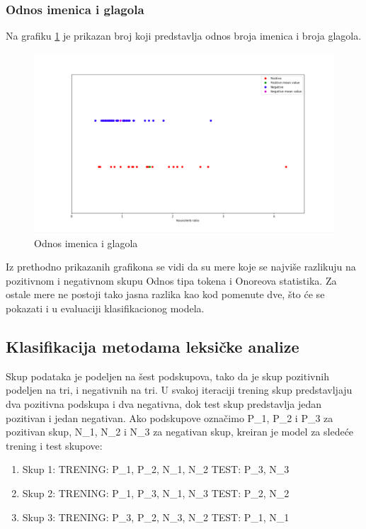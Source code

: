 \documentclass[12pt,oneside]{memoir}
\begin{document}
\FloatBarrier

\subsubsection{Odnos imenica i glagola}

Na grafiku \ref{img:imenicaglagol} je prikazan broj koji predstavlja odnos broja imenica i broja glagola. 

\begin{figure}[ht!]
\centering
\includegraphics[width=.9\textwidth]{images/imenicaglagol.png}
\caption{ Odnos imenica i glagola }
\label{img:imenicaglagol}
\end{figure}
\newpage
\noindent
Iz prethodno prikazanih grafikona se vidi da su mere koje se najviše razlikuju na pozitivnom i negativnom skupu Odnos tipa tokena i Onoreova statistika.  Za ostale mere ne postoji tako jasna razlika kao kod pomenute dve, što će se pokazati i u evaluaciji klasifikacionog modela.
\subsection{Klasifikacija metodama leksičke analize}

Skup podataka je podeljen na šest podskupova, tako da je skup pozitivnih podeljen na tri, i negativnih na tri. U svakoj iteraciji trening skup predstavljaju dva pozitivna podskupa i dva negativna, dok test skup predstavlja jedan pozitivan i jedan negativan.  Ako podskupove označimo P\_1, P\_2 i P\_3 za pozitivan skup,  N\_1, N\_2 i N\_3 za negativan skup,  kreiran je model za sledeće trening i test skupove:

\begin{enumerate}
\item Skup 1: TRENING: P\_1, P\_2, N\_1, N\_2 TEST: P\_3, N\_3
\item Skup 2: TRENING: P\_1, P\_3, N\_1, N\_3 TEST: P\_2, N\_2
\item Skup 3: TRENING: P\_3, P\_2, N\_3, N\_2 TEST: P\_1, N\_1
\end{enumerate}
\end{document}
